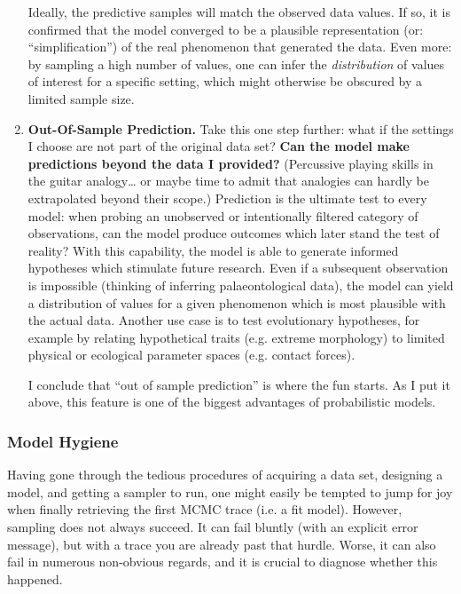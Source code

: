 \begin{enumerate}
Ideally, the predictive samples will match the observed data values.
If so, it is confirmed that the model converged to be a plausible representation (or: ``simplification'') of the real phenomenon that generated the data.
Even more: by sampling a high number of values, one can infer the \emph{distribution} of values of interest for a specific setting, which might otherwise be obscured by a limited sample size.


\item \textbf{Out-Of-Sample Prediction.}
\label{sec:org7e10c89}
Take this one step further: what if the settings I choose are not part of the original data set?
\textbf{Can the model make predictions beyond the data I provided?}
(Percussive playing skills in the guitar analogy\ldots{} or maybe time to admit that analogies can hardly be extrapolated beyond their scope.)
Prediction is the ultimate test to every model: when probing an unobserved or intentionally filtered category of observations, can the model produce outcomes which later stand the test of reality?
With this capability, the model is able to generate informed hypotheses which stimulate future research.
Even if a subsequent observation is impossible (thinking of inferring palaeontological data), the model can yield a distribution of values for a given phenomenon which is most plausible with the actual data.
Another use case is to test evolutionary hypotheses, for example by relating hypothetical traits (e.g. extreme morphology) to limited physical or ecological parameter spaces (e.g. contact forces).

I conclude that ``out of sample prediction'' is where the fun starts.
As I put it above, this feature is one of the biggest advantages of probabilistic models.
\end{enumerate}


\subsubsection{Model Hygiene}
\label{workflow:hygiene}
Having gone through the tedious procedures of acquiring a data set, designing a model, and getting a sampler to run, one might easily be tempted to jump for joy when finally retrieving the first MCMC trace (i.e. a fit model).
However, sampling does not always succeed.
It can fail bluntly (with an explicit error message), but with a trace you are already past that hurdle.
Worse, it can also fail in numerous non-obvious regards, and it is crucial to diagnose whether this happened.

